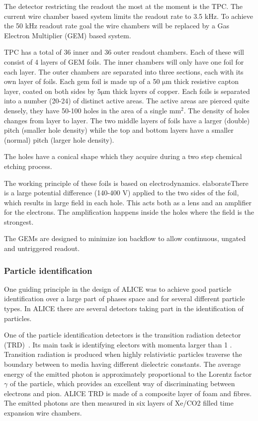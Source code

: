 The detector restricting the readout the most at the moment is the TPC. The current wire chamber based system  limits the readout rate to 3.5 kHz. To achieve the 50 kHz readout rate goal the wire chambers will be replaced by a Gas Electron Multiplier (GEM) based system.

TPC has a total of 36 inner and 36 outer readout chambers. Each of these will consist of 4 layers of GEM foils. The inner chambers will only have one foil for each layer. The outer chambers are separated into three sections, each with its own layer of foils. Each gem foil is made up of a 50 $\mathrm{\mu m}$ thick resistive capton layer, coated on both sides by $5 \mathrm{\mu m}$ thick layers of copper. Each foils is separated into a number (20-24) of distinct active areas. The active areas are pierced quite densely, they have 50-100 holes in the area of a single $\mathrm{mm^2}$. The density of holes changes from layer to layer. The two middle layers of foils have a larger (double) pitch (smaller hole density) while the top and bottom layers have a smaller (normal) pitch (larger hole density).

The holes have a conical shape which they acquire during a two step chemical etching process. 

The working principle of these foils is based on electrodynamics. {\color{red} elaborate}There is a large potential difference (140-400 V) applied to the two sides of the foil, which results in large field in each hole. This acts both as a lens and an amplifier for the electrons. The amplification happens inside the holes where the field is the strongest. 

The GEMs are designed to minimize ion backflow to allow continuous, ungated and untriggered readout.


\subsubsection{Particle identification}
One guiding principle in the design of ALICE was to achieve good particle identification over  a large part of phases space and for several different particle types. In ALICE there are several detectors taking part in the identification of particles. 

One of the particle identification detectors is the transition radiation detector (TRD)~\cite{trd}. Its main task is identifying electors with momenta larger than 1 \gev. Transition radiation is produced when highly relativistic particles traverse the boundary between to media having different dielectric constants. The average energy of the emitted photon is approximately proportional to the Lorentz factor $\gamma$ of the particle, which provides an excellent way of discriminating between electrons and pion. ALICE TRD is made of a composite layer of foam and fibres. The emitted photons are then measured in six layers of Xe/CO2 filled time expansion wire chambers. 

